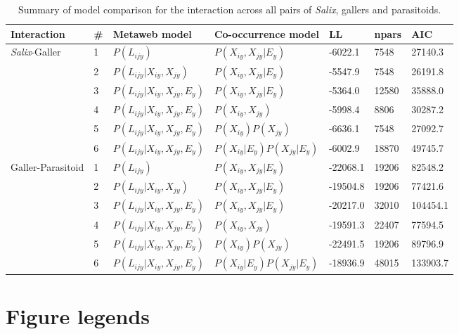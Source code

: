\documentclass[12pt]{article}
\begin{document}
\begin{landscape}
\begin{table}[]
\centering
\caption{Summary of model comparison for the interaction across all pairs of \textit{Salix}, gallers and parasitoids.}
\begin{tabular}{lllllll}
\hline
	Interaction & \# & Metaweb model & Co-occurrence model & LL & npars & AIC \\ \hline
	\textit{Salix}-Galler & 1 & $P(L_{ijy})$ & $P(X_{iy},X_{jy}\lvert E_y)$ & -6022.1 & 7548 & 27140.3 \\
	 & 2 & $P(L_{ijy}\lvert X_{iy},X_{jy})$ & $P(X_{iy},X_{jy}\lvert E_y)$ & -5547.9 & 7548 & 26191.8 \\
	 & 3 & $P(L_{ijy} \lvert  X_{iy}, X_{jy}, E_y)$ & $P(X_{iy},X_{jy}\lvert E_y)$ & -5364.0 & 12580 & 35888.0 \\
	 & 4 & $P(L_{ijy} \lvert  X_{iy}, X_{jy}, E_y)$ & $P(X_{iy},X_{jy})$ & -5998.4 & 8806 & 30287.2 \\
	 & 5 & $P(L_{ijy} \lvert  X_{iy}, X_{jy}, E_y)$ & $P(X_{iy})P(X_{jy})$ & -6636.1 & 7548 & 27092.7 \\
	 & 6 & $P(L_{ijy} \lvert  X_{iy}, X_{jy}, E_y)$ & $P(X_{iy}\lvert E_y)P(X_{jy}\lvert E_y)$ & -6002.9 & 18870 & 49745.7 \\ \hline
	Galler-Parasitoid & 1 & $P(L_{ijy})$ & $P(X_{iy},X_{jy}\lvert E_y)$ & -22068.1 & 19206 & 82548.2 \\
	 & 2 & $P(L_{ijy} \lvert  X_{iy}, X_{jy})$ & $P(X_{iy},X_{jy}\lvert E_y)$ & -19504.8 & 19206 & 77421.6 \\
	 & 3 & $P(L_{ijy} \lvert  X_{iy}, X_{jy}, E_y)$ & $P(X_{iy},X_{jy}\lvert E_y)$ & -20217.0 & 32010 & 104454.1 \\
	 & 4 & $P(L_{ijy} \lvert  X_{iy}, X_{jy}, E_y)$ & $P(X_{iy},X_{jy})$ & -19591.3 & 22407 & 77594.5 \\
	 & 5 & $P(L_{ijy} \lvert  X_{iy}, X_{jy}, E_y)$ & $P(X_{iy})P(X_{jy})$ & -22491.5 & 19206 & 89796.9 \\
	 & 6 & $P(L_{ijy} \lvert  X_{iy}, X_{jy}, E_y)$ & $P(X_{iy}\lvert E_y)P(X_{jy}\lvert E_y)$ & -18936.9 & 48015 & 133903.7 \\
\hline
\end{tabular}
\end{table}
\end{landscape}

\newpage
\section*{Figure legends}
\end{document}
